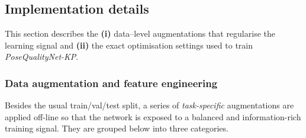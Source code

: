 \documentclass{article}
\begin{document}
\subsection{Implementation details}
\label{sec:impl}

This section describes the \textbf{(i)} data–level augmentations that
regularise the learning signal and \textbf{(ii)} the exact optimisation
settings used to train \textit{PoseQualityNet-KP}.  

\subsubsection{Data augmentation and feature engineering}
\label{sec:aug}

Besides the usual train/val/test split, a series of \emph{task-specific}
augmentations are applied off-line so that the network is exposed to a
balanced and information-rich training signal.  They are grouped below
into three categories.
\end{document}
